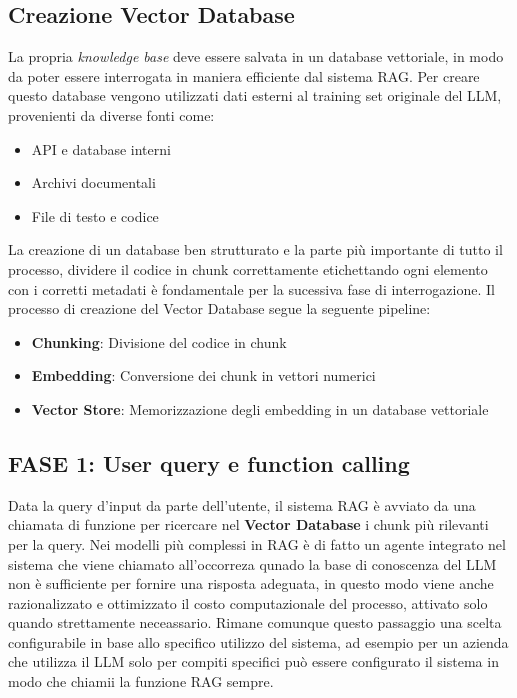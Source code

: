 \documentclass[12pt,a4paper,openright,twoside]{book}
\begin{document}

\subsection{Creazione Vector Database}
La propria \emph{knowledge base} deve essere salvata in un database vettoriale, in modo da poter essere interrogata in maniera efficiente dal sistema RAG.
Per creare questo database vengono utilizzati dati esterni al training set originale del LLM, provenienti da diverse fonti come:
\begin{itemize}
    \item API e database interni
    \item Archivi documentali
    \item File di testo e codice
\end{itemize}
La creazione di un database ben strutturato e la parte più importante di tutto il processo, dividere il codice in chunk correttamente etichettando ogni elemento con i corretti metadati è fondamentale per la sucessiva fase di interrogazione.
Il processo di creazione del Vector Database segue la seguente pipeline:
\begin{itemize}
    \item \textbf{Chunking}: Divisione del codice in chunk 
    \item \textbf{Embedding}: Conversione dei chunk in vettori numerici
    \item \textbf{Vector Store}: Memorizzazione degli embedding in un database vettoriale
\end{itemize}


\subsection{FASE 1: User query e function calling}
Data la query d'input da parte dell'utente, il sistema RAG è avviato da una chiamata di funzione per ricercare nel
\textbf{Vector Database} i chunk più rilevanti per la query.
Nei modelli più complessi in RAG è di fatto un agente integrato nel sistema che viene chiamato all'occorreza qunado la base di conoscenza del LLM non è sufficiente per fornire una risposta adeguata,
in questo modo viene anche razionalizzato e ottimizzato il costo computazionale del processo,
attivato solo quando strettamente neceassario.
Rimane comunque questo passaggio una scelta configurabile in base allo specifico utilizzo del sistema,
ad esempio per un azienda che utilizza il LLM solo per compiti specifici può essere configurato il sistema in modo che chiamii
la funzione RAG sempre.
\end{document}
